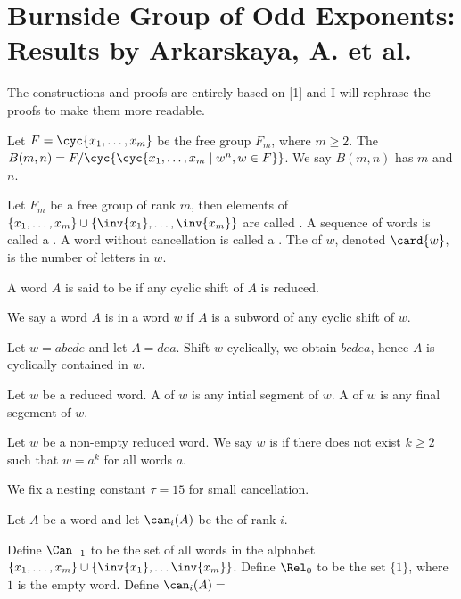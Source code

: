 \section{Burnside Group of Odd Exponents: Results by Arkarskaya, A. et al.}
\par
The constructions and proofs are entirely based on [1] and I will rephrase the proofs to make them more readable.
\begin{definition}
    Let $F=\cyc{{x}_{1},\dots,{x}_{m}}$ be the free group ${F}_{m}$, where $m\ge 2$. The  $B(m,n)=F/\cyc{\cyc{{x}_{1},\dots,{x}_{m}\mid{w}^{n},w\in F}}$. We say $B(m,n)$ has  $m$ and  $n$.
\end{definition}
\begin{definition}
    Let ${F}_{m}$ be a free group of rank $m$, then elements of $\{{x}_{1},\dots,{x}_{m}\}\cup\{\inv{{x}_{1}},\dots,\inv{{x}_{m}}\}$ are called . A sequence of words is called a . A word without cancellation is called a . The  of $w$, denoted $\card{w}$, is the number of letters in $w$.
\end{definition}
\begin{definition}
    A word $A$ is said to be  if any cyclic shift of $A$ is reduced.
\end{definition}
\begin{definition}
    We say a word $A$ is  in a word $w$ if $A$ is a subword of any cyclic shift of $w$.
\end{definition}
\begin{example}
    Let $w=abcde$ and let $A=dea$. Shift $w$ cyclically, we obtain $bcdea$, hence $A$ is cyclically contained in $w$.
\end{example}
\begin{definition}
    Let $w$ be a reduced word. A  of $w$ is any intial segment of $w$. A  of $w$ is any final segement of $w$.
\end{definition}
\begin{definition}
    Let $w$ be a non-empty reduced word. We say $w$ is  if there does not exist $k\ge 2$ such that $w={a}^{k}$ for all words $a$.
\end{definition}
\begin{convention}
    We fix a nesting constant $\tau=15$ for small cancellation.
\end{convention}
\begin{convention}
    Let $A$ be a word and let ${\can}_{i}(A)$ be the  of rank $i$.


    Define ${\Can}_{-1}$ to be the set of all words in the alphabet $\{{x}_{1},\dots,{x}_{m}\}\cup\{\inv{{x}_{1}},\dots\inv{{x}_{m}}\}$. Define ${\Rel}_{0}$ to be the set $\{1\}$, where $1$ is the empty word. Define ${\can}_{i}(A)=$
\end{convention}
